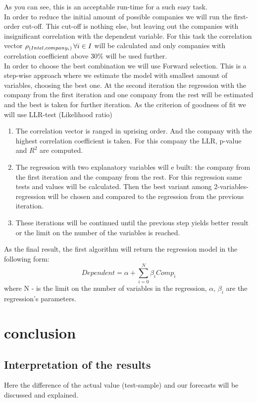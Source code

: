 \documentclass[12pt, a4paper]{article}
\begin{document}
As you can see, this is an acceptable run-time for a such easy task.\\
In order to reduce the initial amount of possible companies we will run the first-order cut-off. This cut-off is nothing else, but leaving out the companies with insignificant correlation with the dependent variable. For this task the correlation vector $\rho_{(Intel, company_{i})} \thinspace \forall i\in I$ will be calculated and only companies with correlation coefficient above 30\% will be used further.\\ 
In order to choose the best combination we will use Forward selection. This is a step-wise approach where we estimate the model with smallest amount of variables, choosing the best one. At the second iteration the regression with the company from the first iteration and one company from the rest will be estimated and the best is taken for further iteration. As the criterion of goodness of fit we will use LLR-test (Likelihood ratio)
\begin{enumerate}
	\item The correlation vector is ranged in uprising order. And the company with the highest correlation coefficient is taken. For this company the LLR, p-value and $R^2$ are computed.
	\item The regression with two explanatory variables will e built: the company from the first iteration and the company from the rest. For this regression same tests and values will be calculated. Then the best variant among 2-variables-regression will be chosen and compared to the regression from the previous iteration.
	\item These iterations will be continued until the previous step yields better result or the limit on the number of the variables is reached. 
\end{enumerate} 
As the final result, the first algorithm will return the regression model in the following form: \[Dependent = \alpha + \sum_{i=0}^{N} \beta_{i}Comp_{i}\] 
where N - is the limit on the number of variables in the regression, $\alpha$, $\beta_{i}$ are the regression's parameters.

\newpage
\section{conclusion}
\subsection{Interpretation of the results}
Here the difference of the actual value (test-sample) and our forecasts will be discussed and explained.
\end{document}
